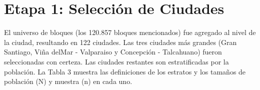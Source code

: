 \documentclass[
]{book}
\begin{document}
\hypertarget{etapa-1-selecciuxf3n-de-ciudades}{%
\section{Etapa 1: Selección de Ciudades}\label{etapa-1-selecciuxf3n-de-ciudades}}

El universo de bloques (los 120.857 bloques mencionados) fue agregado al nivel de la ciudad, resultando en 122 ciudades. Las tres ciudades más grandes (Gran Santiago, Viña delMar - Valparaiso y Concepción - Talcahuano) fueron seleccionadas con certeza. Las ciudades restantes son estratificadas por la población. La Tabla 3 muestra las definiciones de los estratos y los tamaños de población (N) y muestra (n) en cada uno.

\begin{table}


\end{table}
\end{document}
